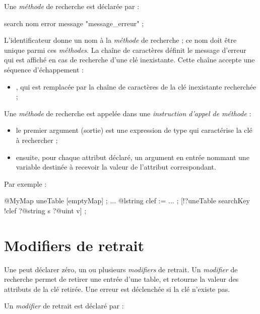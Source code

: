 Une \emph{méthode} de recherche est déclarée par :

\begin{galgascode}
search nom error message "message_erreur" ;
\end{galgascode}

L'identificateur  donne un nom à la \emph{méthode} de recherche ; ce nom doit être unique parmi ces \emph{méthodes}. La chaîne de caractères  définit le message d'erreur qui est affiché en cas de recherche d'une clé inexistante. Cette chaîne accepte une séquence d'échappement :
\begin{itemize}
  \item {}, qui est remplacée par la chaîne de caractères de la clé inexistante recherchée ;
\end{itemize}


Une \emph{méthode} de recherche est appelée dans une \emph{instruction d'appel de méthode} :
\begin{itemize}
  \item le premier argument (sortie) est une expression de type  qui caractérise la clé à rechercher ;
  \item ensuite, pour chaque attribut déclaré, un argument en entrée nommant une variable destinée à recevoir la valeur de l'attribut correspondant.
\end{itemize}

Par exemple :
\begin{galgascode}
@MyMap uneTable [emptyMap] ;
...
@lstring clef := ... ;
[!?uneTable searchKey !clef ?@string s ?@uint v] ;
\end{galgascode}













\section{Modifiers de retrait}

Une  peut déclarer zéro, un ou plusieurs \emph{modifiers} de retrait. Un \emph{modifier} de recherche permet de retirer une entrée d'une table, et retourne la valeur des attributs de la clé retirée. Une erreur est déclenchée si la clé n'existe pas.


Un \emph{modifier} de retrait est déclaré par :

